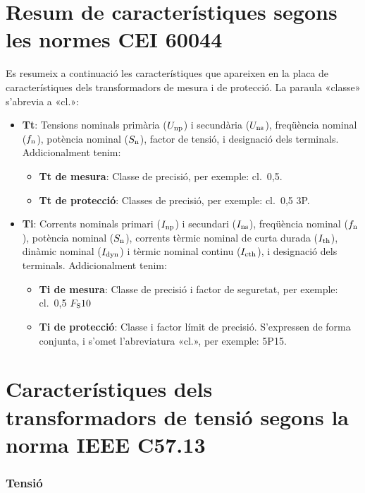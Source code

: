 \section{Resum de característiques segons les normes CEI 60044}

Es resumeix a continuació les característiques que apareixen en la placa de característiques dels transformadors de mesura i de protecció. La paraula
«classe» s'abrevia a «cl.»:

\begin{itemize}
   \item \textbf{Tt}: Tensions nominals  primària ($U_\mathrm{np}$) i secundària ($U_\mathrm{ns}$), freqüència nominal ($f_\mathrm{n}$),
    potència nominal ($S_\mathrm{n}$), factor de tensió, i     designació dels terminals. Addicionalment tenim:
       \begin{itemize}
           \item \textbf{Tt de mesura}: Classe de precisió, per  exemple: cl.~0,5.
           \item \textbf{Tt de protecció}: Classes de precisió, per  exemple: cl.~0,5 3P.
        \end{itemize}
    \item \textbf{Ti}: Corrents nominals primari ($I_\mathrm{np}$) i secundari ($I_\mathrm{ns}$), freqüència nominal ($f_\mathrm{n}$),
     potència nominal ($S_\mathrm{n}$),  corrents tèrmic nominal de curta durada ($I_\mathrm{th}$), dinàmic nominal ($I_\mathrm{dyn}$) i tèrmic nominal continu ($I_\mathrm{cth}$), i     designació dels terminals. Addicionalment tenim:
        \begin{itemize}
           \item \textbf{Ti de mesura}: Classe de precisió i factor de seguretat, per exemple: cl.~0,5 $F_\mathrm{S} 10$
           \item \textbf{Ti de protecció}: Classe i factor límit de precisió. S'expressen de forma conjunta, i s'omet l'abreviatura «cl.»,  per exemple: 5P15.
        \end{itemize}
\end{itemize}


\section{Característiques dels transformadors de tensió segons la norma IEEE C57.13}

\subsubsection{Tensió}

